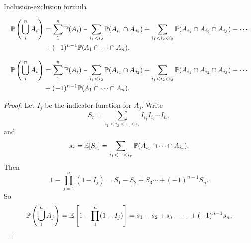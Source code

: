 %
\begin{note}
  \begin{field}
    Inclusion-exclusion formula
  \end{field}
  \begin{field}
    \begin{thm}
      \begin{align*}
        \P\left(\bigcup_i^n A_i\right) &= \sum_1^n \P(A_i) - \sum_{i_1 < i_2} \P(A_{i_1}\cap A_{j_2}) + \sum_{i_1 < i_2 < i_3}\P(A_{i_1}\cap A_{i_2} \cap A_{i_3}) - \cdots\\
        &+ (-1)^{n - 1} \P(A_1\cap \cdots \cap A_n).
      \end{align*}
    \end{thm}
  \end{field}
  \xplain{}%
\end{note}

%
\begin{note}
  \begin{field}
    \begin{thm}
      \begin{align*}
        \P\left(\bigcup_i^n A_i\right) &= \sum_1^n \P(A_i) - \sum_{i_1 < i_2} \P(A_{i_1}\cap A_{j_2}) + \sum_{i_1 < i_2 < i_3}\P(A_{i_1}\cap A_{i_2} \cap A_{i_3}) - \cdots\\
        &+ (-1)^{n - 1} \P(A_1\cap \cdots \cap A_n).
      \end{align*}
    \end{thm}
  \end{field}
  \begin{field}
    \begin{proof}
      Let $I_j$ be the indicator function for $A_j$. Write
      \[
        S_r = \sum_{i_1 < i_2 < \cdots < i_r}I_{i_1}I_{i_2}\cdots I_{i_r},
      \]
      and
      \[
        s_r = \E[S_r] = \sum_{i_1 < \cdots < i_r}\P(A_{i_1}\cap \cdots \cap A_{i_r}).
      \]
      Then
      \[
        1 - \prod_{j = 1}^n(1 - I_j) = S_1 - S_2 + S_3 \cdots + (-1)^{n - 1}S_n.
      \]
      So
      \[
        \P\left(\bigcup_1^n A_j\right) = \E\left[1 - \prod_1^n(1 - I_j)\right] = s_1 - s_2 + s_3 - \cdots + (-1)^{n - 1}s_n.\qedhere
      \]
    \end{proof}
  \end{field}
  \xplain{}%
\end{note}


